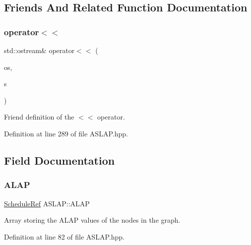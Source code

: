 \subsection{Friends And Related Function Documentation}
\mbox{\label{classASLAP_af8ab58211340ecad608499bdac9dd41f}} 
\subsubsection{\texorpdfstring{operator$<$$<$}{operator<<}}
{\footnotesize\ttfamily std\+::ostream\& operator$<$$<$ (\begin{DoxyParamCaption}\item[{std\+::ostream \&}]{os,  }\item[{const \hyperlink{classASLAP}{A\+S\+L\+AP} \&}]{s }\end{DoxyParamCaption})\hspace{0.3cm}{\ttfamily [friend]}}



Friend definition of the $<$$<$ operator. 



Definition at line 289 of file A\+S\+L\+A\+P.\+hpp.



\subsection{Field Documentation}
\mbox{\label{classASLAP_a18130c80504e9610e2e7abab7a9de0c3}} 
\subsubsection{\texorpdfstring{A\+L\+AP}{ALAP}}
{\footnotesize\ttfamily \hyperlink{schedule_8hpp_af67f402958b3b52a1ec5cc4ce08ae3b9}{Schedule\+Ref} A\+S\+L\+A\+P\+::\+A\+L\+AP\hspace{0.3cm}{\ttfamily [private]}}



Array storing the A\+L\+AP values of the nodes in the graph. 



Definition at line 82 of file A\+S\+L\+A\+P.\+hpp.



